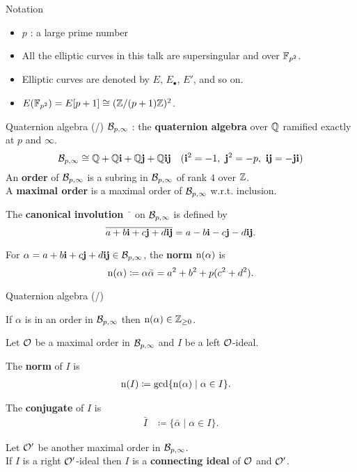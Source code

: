 
\begin{frame}{Notation}

    \begin{itemize}
        \setlength{\itemsep}{10pt}
        \item $p$ : a large prime number
        \item All the elliptic curves in this talk are supersingular and over $\mathbb{F}_{p^2}$.
        \item Elliptic curves are denoted by $E$, $E_\bullet$, $E'$, and so on.
        \item $E(\mathbb{F}_{p^2}) = E[p+1] \cong (\mathbb{Z}/(p+1)\mathbb{Z})^2$.
    \end{itemize}

\end{frame}

\newcommand*{\quatotal}{\total{cnt_quat}}
\begin{frame}{Quaternion algebra (/\quatotal{})}
    $\mathcal{B}_{p,\infty}$ : the \textbf{quaternion algebra} over $\mathbb{Q}$ ramified exactly at $p$ and $\infty$.
    $$\mathcal{B}_{p,\infty} \cong \mathbb{Q} + \mathbb{Q}\mathbf{i} + \mathbb{Q}\mathbf{j} + \mathbb{Q}\mathbf{i}\mathbf{j} \quad (\mathbf{i}^2 = -1,\ \mathbf{j}^2 = -p,\ \mathbf{i}\mathbf{j} = -\mathbf{j}\mathbf{i})$$
    An \textbf{order} of $\mathcal{B}_{p,\infty}$ is a subring in $\mathcal{B}_{p,\infty}$ of rank $4$ over $\mathbb{Z}$.\\
    A \textbf{maximal order} is a maximal order of $\mathcal{B}_{p,\infty}$ w.r.t. inclusion.

    \vspace{10pt}
    The \textbf{canonical involution} $\bar{\phantom{a}}$ on $\mathcal{B}_{p,\infty}$ is defined by
    $$\overline{a + b\mathbf{i} + c\mathbf{j} + d\mathbf{i}\mathbf{j}} = a - b\mathbf{i} - c\mathbf{j} - d\mathbf{i}\mathbf{j}.$$

    For $\alpha = a + b\mathbf{i} + c\mathbf{j} + d\mathbf{i}\mathbf{j} \in \mathcal{B}_{p,\infty}$,
    the \textbf{norm} $\mathrm{n}(\alpha)$ is
    $$\mathrm{n}(\alpha) \coloneqq \alpha\bar{\alpha} = a^2 + b^2 + p(c^2 + d^2).$$
\end{frame}

\begin{frame}{Quaternion algebra (/\quatotal{})}
    \begin{lemma}
        If $\alpha$ is in an order in $\mathcal{B}_{p,\infty}$ then $\mathrm{n}(\alpha) \in \mathbb{Z}_{\geq 0}$.
    \end{lemma}

    \vspace{10pt}
    Let $\mathcal{O}$ be a maximal order in $\mathcal{B}_{p,\infty}$
    and $I$ be a left $\mathcal{O}$-ideal.

    The \textbf{norm} of $I$ is
    \begin{align*}
        \mathrm{n}(I) &\coloneqq \gcd\{\mathrm{n}(\alpha) \mid \alpha \in I\}.
    \end{align*}

    The \textbf{conjugate} of $I$ is
    \begin{align*}
        \bar{I} &\coloneqq \{\bar{\alpha} \mid \alpha \in I\}.
    \end{align*}

    Let $\mathcal{O}'$ be another maximal order in $\mathcal{B}_{p,\infty}$.\\
    If $I$ is a right $\mathcal{O}'$-ideal then $I$ is a \textbf{connecting ideal} of $\mathcal{O}$ and $\mathcal{O}'$.
\end{frame}

